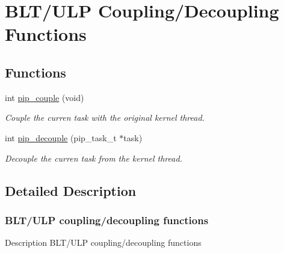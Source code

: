 \hypertarget{group__ulp-6-coupling}{\section{B\-L\-T/\-U\-L\-P Coupling/\-Decoupling Functions}
\label{group__ulp-6-coupling}
}
\subsection*{Functions}
\begin{DoxyCompactItemize}
\item 
int \hyperlink{group__ulp-6-coupling_ga62b74934c0295bbe1aeab544365eb20f}{pip\-\_\-couple} (void)
\begin{DoxyCompactList}\small\item\em Couple the curren task with the original kernel thread. \end{DoxyCompactList}\item 
int \hyperlink{group__ulp-6-coupling_ga1c77a30388d68e5f12667007ae430c1b}{pip\-\_\-decouple} (pip\-\_\-task\-\_\-t $\ast$task)
\begin{DoxyCompactList}\small\item\em Decouple the curren task from the kernel thread. \end{DoxyCompactList}\end{DoxyCompactItemize}


\subsection{Detailed Description}
\hypertarget{ulp-coupling}{}\subsubsection{B\-L\-T/\-U\-L\-P coupling/decoupling functions}\label{ulp-coupling}
\begin{DoxyParagraph}{Description}
B\-L\-T/\-U\-L\-P coupling/decoupling functions 
\end{DoxyParagraph}


